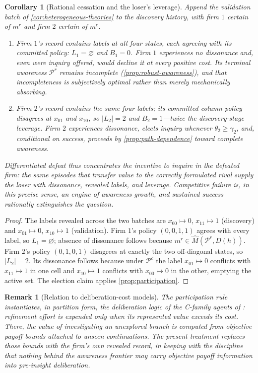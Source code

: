 \documentclass[11pt]{article}
\newtheorem{corollary}[assumption]{Corollary}
\newtheorem{remark}[assumption]{Remark}
\newcommand{\emptysetset}{\varnothing}
\newcommand{\Prow}{\mathcal P^{r}}
\newcommand{\Pcol}{\mathcal P^{c}}
\begin{document}
\begin{corollary}[Rational cessation and the loser's leverage]
\label{cor:loser-leverage}
Append the validation batch of \cref{cor:heterogeneous-theories} to the
discovery history, with firm $1$ certain of $m^r$ and firm $2$ certain of
$m^c$.
\begin{enumerate}[label=(\roman*)]
  \item Firm $1$'s record contains labels at all four states, each agreeing
  with its committed policy: $L_1=\emptysetset$ and $B_1=0$.  Firm $1$
  experiences no dissonance and, even were inquiry offered, would decline it
  at every positive cost.  Its terminal awareness $\Prow$ remains incomplete
  (\cref{prop:robust-awareness}), and that incompleteness is subjectively
  optimal rather than merely mechanically absorbing.
  \item Firm $2$'s record contains the same four labels; its committed column
  policy disagrees at $x_{01}$ and $x_{10}$, so $\lvert L_2\rvert=2$ and
  $B_2=1$---twice the discovery-stage leverage.  Firm $2$ experiences
  dissonance, elects inquiry whenever $\theta_2\geq\gamma_2$, and, conditional
  on success, proceeds by \cref{prop:path-dependence} toward complete
  awareness.
\end{enumerate}
Differentiated defeat thus concentrates the incentive to inquire in the
defeated firm: the same episodes that transfer value to the correctly
formulated rival supply the loser with dissonance, revealed labels, and
leverage.  Competitive failure is, in this precise sense, an engine of
awareness growth, and sustained success rationally extinguishes the question.
\end{corollary}

\begin{proof}
The labels revealed across the two batches are $x_{00}\mapsto0$,
$x_{11}\mapsto1$ (discovery) and $x_{01}\mapsto0$, $x_{10}\mapsto1$
(validation).  Firm $1$'s policy $(0,0,1,1)$ agrees with every label, so
$L_1=\emptysetset$; absence of dissonance follows because
$m^r\in\widehat M(\Prow,D(h))$.  Firm $2$'s policy $(0,1,0,1)$ disagrees at
exactly the two off-diagonal states, so $\lvert L_2\rvert=2$.  Its dissonance
follows because under $\Pcol$ the label $x_{01}\mapsto0$ conflicts with
$x_{11}\mapsto1$ in one cell and $x_{10}\mapsto1$ conflicts with
$x_{00}\mapsto0$ in the other, emptying the active set.  The election claim
applies \cref{prop:participation}.
\end{proof}

\begin{remark}[Relation to deliberation-cost models]
\label{rem:cplus-relation}
The participation rule instantiates, in partition form, the deliberation logic
of the C-family agents of \cite{RyallAction2026}: refinement effort is
expended only when its represented value exceeds its cost.  There, the value
of investigating an unexplored branch is computed from objective payoff bounds
attached to unseen continuations.  The present treatment replaces those bounds
with the firm's own revealed record, in keeping with the discipline that
nothing behind the awareness frontier may carry objective payoff information
into pre-insight deliberation.
\end{remark}
\end{document}
